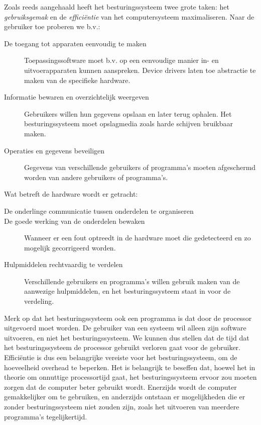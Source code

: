 Zoals reeds aangehaald heeft het besturingssysteem twee grote
taken: het \emph{gebruiksgemak} en de
\emph{effici\"entie} van het computersysteem maximaliseren.
Naar de gebruiker toe proberen we b.v.:

\begin{description}
\item[De toegang tot apparaten eenvoudig te maken]Toepassingssoftware moet b.v.
op een eenvoudige manier in- en uitvoerapparaten kunnen aanspreken. Device
drivers laten toe abstractie te maken van de specifieke hardware.
\item[Informatie bewaren en overzichtelijk weergeven]Gebruikers willen hun
gegevens opslaan en later terug ophalen. Het besturingssysteem moet opslagmedia
zoals harde schijven bruikbaar maken.
\item[Operaties en gegevens beveiligen]Gegevens van verschillende gebruikers of
programma's moeten afgeschermd worden van andere gebruikers of programma's.
\end{description}

Wat betreft de hardware wordt er getracht:

\begin{description}
\item[De onderlinge communicatie tussen onderdelen te organiseren]
\item[De goede werking van de onderdelen bewaken]Wanneer er een fout optreedt in
de hardware moet die gedetecteerd en zo mogelijk gecorrigeerd worden.
\item[Hulpmiddelen rechtvaardig te verdelen]Verschillende gebruikers en
programma's willen gebruik maken van de aanwezige hulpmiddelen, en het
besturingssysteem staat in voor de verdeling.
\end{description}

Merk op dat het besturingssysteem ook een programma is dat door de
processor uitgevoerd moet worden. De gebruiker van een systeem wil
alleen zijn software uitvoeren, en niet het besturingssysteem. We kunnen
dus stellen dat de tijd dat het besturingssysteem de processor gebruikt
verloren gaat voor de gebruiker. Effici\"entie is dus een belangrijke
vereiste voor het besturingssysteem, om de hoeveelheid overhead te
beperken. Het is belangrijk te beseffen dat, hoewel het in theorie om
onnuttige processortijd gaat, het besturingssysteem ervoor zou moeten
zorgen dat de computer beter gebruikt wordt. Enerzijds wordt de computer
gemakkelijker om te gebruiken, en anderzijds ontstaan er mogelijkheden
die er zonder besturingssysteem niet zouden zijn, zoals het uitvoeren
van meerdere programma's tegelijkertijd.

